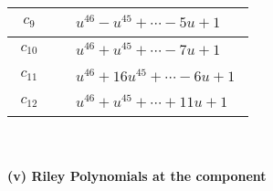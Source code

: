 \documentclass[1p]{elsarticle_modified}
\theoremstyle{definition}
\begin{document}
\begin{tabular}{m{50pt}|m{274pt}}
\hline $$\begin{aligned}c_{9}\end{aligned}$$&$\begin{aligned}
&u^{46}- u^{45}+\cdots-5 u+1
\end{aligned}$\\
\hline $$\begin{aligned}c_{10}\end{aligned}$$&$\begin{aligned}
&u^{46}+u^{45}+\cdots-7 u+1
\end{aligned}$\\
\hline $$\begin{aligned}c_{11}\end{aligned}$$&$\begin{aligned}
&u^{46}+16 u^{45}+\cdots-6 u+1
\end{aligned}$\\
\hline $$\begin{aligned}c_{12}\end{aligned}$$&$\begin{aligned}
&u^{46}+u^{45}+\cdots+11 u+1
\end{aligned}$\\
\hline
\end{tabular}\\~\\
\newpage\renewcommand{\arraystretch}{1}
\flushleft \textbf{(v) Riley Polynomials at the component}\newline \\
\end{document}
